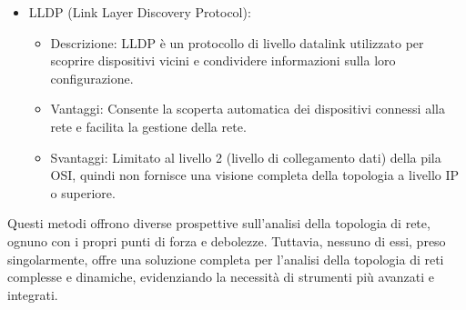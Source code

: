 \documentclass[target=bach,aauheader=,style=]{thud}
\begin{document}
\begin{itemize}
  \item LLDP (Link Layer Discovery Protocol):
    \begin{itemize}
      \item Descrizione: LLDP è un protocollo di livello datalink utilizzato per scoprire dispositivi vicini e condividere informazioni sulla loro configurazione.
      \item Vantaggi: Consente la scoperta automatica dei dispositivi connessi alla rete e facilita la gestione della rete.
      \item Svantaggi: Limitato al livello 2 (livello di collegamento dati) della pila OSI, quindi non fornisce una visione completa della topologia a livello IP o superiore.
    \end{itemize}

\end{itemize}

Questi metodi offrono diverse prospettive sull'analisi della topologia di rete, ognuno con i propri punti di forza e debolezze. Tuttavia, nessuno di essi, preso singolarmente, offre una soluzione completa per l'analisi della topologia di reti complesse e dinamiche, evidenziando la necessità di strumenti più avanzati e integrati.
\end{document}
